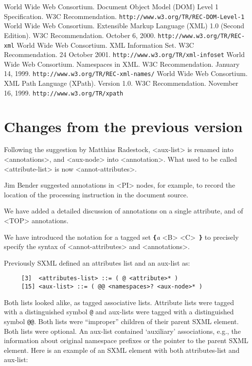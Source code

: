 \documentclass[10pt]{article}
\begin{document}
\begin{thebibliography}{}
 World Wide Web Consortium. Document Object Model (DOM) Level 1
Specification. W3C Recommendation. \texttt{http://www.w3.org/TR/REC-DOM-Level-1} 
 World Wide Web Consortium. Extensible Markup Language (XML)
1.0 (Second Edition). W3C Recommendation. October 6, 2000. \texttt{http://www.w3.org/TR/REC-xml} 
 World Wide Web Consortium. XML Information Set.  W3C Recommendation. 24 October 2001. \texttt{http://www.w3.org/TR/xml-infoset} 
 World Wide Web Consortium. Namespaces in XML. W3C Recommendation. January 14, 1999. \texttt{http://www.w3.org/TR/REC-xml-names/} 
 World Wide Web Consortium. XML Path Language (XPath).
Version 1.0. W3C Recommendation. November 16, 1999. \texttt{http://www.w3.org/TR/xpath} 
\end{thebibliography}
\section{Changes from the previous version}
Following the suggestion by Matthias Radestock, <aux-list> is renamed into <annotations>, and <aux-node> into <annotation>. What used to be called
<attribute-list> is now <annot-attributes>.

Jim Bender suggested annotations in <PI> nodes, for
example, to record the location of the processing instruction in the
document source.

We have added a detailed discussion of annotations on a single
attribute, and of <TOP> annotations.

We have introduced the notation for a tagged set \texttt{\textbf{\{}}{\itshape a} <B> <C>\texttt{ \textbf{\}}} to precisely specify the syntax of <annot-attributes> and <annotations>.

Previously SXML defined an attributes list and an aux-list as:

\begin{verbatim}
     [3]  <attributes-list> ::= ( @ <attribute>* )
     [15] <aux-list> ::= ( @@ <namespaces>? <aux-node>* )
\end{verbatim}
Both lists looked alike, as tagged associative lists. Attribute
lists were tagged with a distinguished symbol \texttt{@} and
aux-lists were tagged with a distinguished symbol \texttt{@@}. Both lists were ``improper'' children of their parent SXML
element. Both lists were optional.  An aux-list contained `auxiliary'
associations, e.g., the information about original namespace prefixes
or the pointer to the parent SXML element. Here is an example of an SXML
element with both attributes-list and aux-list:
\end{document}
